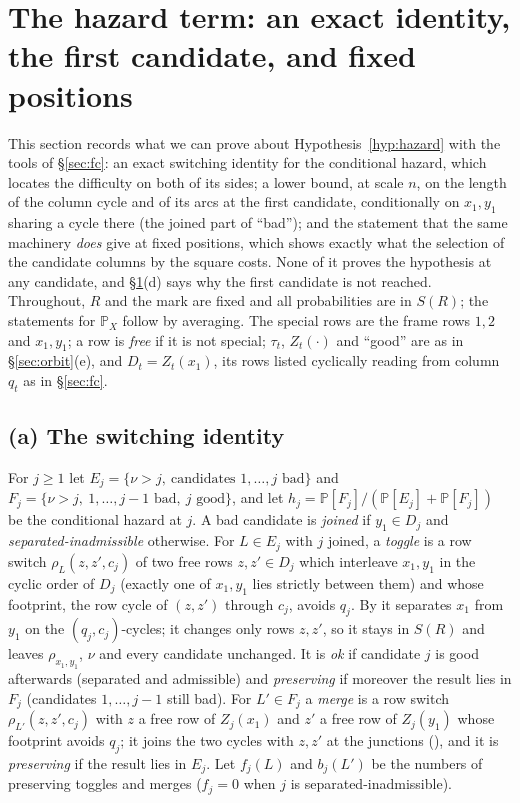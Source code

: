 \documentclass[11pt]{article}
\theoremstyle{definition}
\renewcommand{\Pr}{\mathbb{P}}
\begin{document}
\section{The hazard term: an exact identity, the first candidate, and fixed positions}\label{sec:hazardid}

This section records what we can prove about Hypothesis~\ref{hyp:hazard} with the tools of
\S\ref{sec:fc}: an exact switching identity for the conditional hazard, which locates the
difficulty on both of its sides; a lower bound, at scale $n$, on the length of the column
cycle and of its arcs at the first candidate, conditionally on $x_1,y_1$ sharing a cycle there
(the joined part of ``bad'');
and the statement that the same machinery \emph{does} give at fixed positions, which shows
exactly what the selection of the candidate columns by the square costs.  None of it
proves the hypothesis at any candidate, and \S\ref{sec:hazardid}(d) says why the first
candidate is not reached.  Throughout, $R$ and the mark are fixed and all probabilities are
in $S(R)$; the statements for $\Pr_X$ follow by averaging.  The special rows are the frame rows $1,2$ and
$x_1,y_1$; a row is \emph{free} if it is not special; $\tau_t$, $Z_t(\cdot)$ and ``good'' are as in
\S\ref{sec:orbit}(e), and $D_t=Z_t(x_1)$, its rows listed cyclically reading from column $q_t$ as in
\S\ref{sec:fc}.

\subsection*{(a) The switching identity}

For $j\ge1$ let $E_j=\{\nu>j,\ \text{candidates }1,\dots,j\text{ bad}\}$ and
$F_j=\{\nu>j,\ 1,\dots,j-1\text{ bad},\ j\text{ good}\}$, and let
$h_j=\Pr[F_j]/(\Pr[E_j]+\Pr[F_j])$ be the conditional hazard at $j$.  A bad candidate is
\emph{joined} if $y_1\in D_j$ and \emph{separated-inadmissible} otherwise.  For $L\in E_j$
with $j$ joined, a \emph{toggle} is a row switch $\rho_L(z,z',c_j)$ of two free rows
$z,z'\in D_j$ which interleave $x_1,y_1$ in the cyclic order of $D_j$ (exactly one of
$x_1,y_1$ lies strictly between them) and whose footprint, the row cycle of $(z,z')$
through $c_j$, avoids $q_j$.  By \cite[Lemma~2.4(1)]{AM26} it separates $x_1$ from $y_1$
on the $(q_j,c_j)$-cycles; it changes only rows $z,z'$, so it stays in $S(R)$ and leaves
$\rho_{x_1,y_1}$, $\nu$ and every candidate unchanged.  It is \emph{ok} if candidate $j$ is good afterwards (separated and
admissible) and \emph{preserving} if moreover the result lies in $F_j$ (candidates
$1,\dots,j-1$ still bad).  For $L'\in F_j$ a \emph{merge} is a row switch
$\rho_{L'}(z,z',c_j)$ with $z$ a free row of $Z_j(x_1)$ and $z'$ a free row of
$Z_j(y_1)$ whose footprint avoids $q_j$; it joins the two cycles with $z,z'$ at the
junctions (\cite[Lemma~2.4(2)]{AM26}), and it is \emph{preserving} if the result lies in
$E_j$.  Let $f_j(L)$ and $b_j(L')$ be the numbers of preserving toggles and merges ($f_j=0$ when
$j$ is separated-inadmissible).
\end{document}
